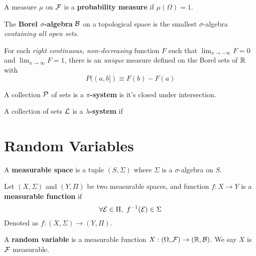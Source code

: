 \documentclass[11pt]{article}
\begin{document}
		
		\begin{definition}
			A measure $\mu$ on $\mathcal{{F}}$ is a \textbf{probability measure} if $\mu(\Omega) = 1$.
		\end{definition}
		
		\begin{definition}
			The \textbf{Borel $\sigma$-algebra} $\mathcal{{B}}$ on a topological space is the smallest $\sigma$-algebra \emph{containing all open sets}.
		\end{definition}
		
		\begin{theorem}
			For each \emph{right continuous, non-decreasing} function $F$ such that $\lim_{x \to -\infty} F = 0$ and $\lim_{x \to \infty} F = 1$, there is an \emph{unique} measure defined on the Borel sets of $\mathbb{R}$ with 
			\begin{equation}
				P((a,b]) \equiv F(b) - F(a)
			\end{equation}
		\end{theorem}
		
		\begin{definition}
			A collection $\mathcal{{P}}$ of sets is a \textbf{$\pi$-system} is it's closed under intersection.
		\end{definition}
		
		\begin{definition}
			A collection of sets $\mathcal{{L}}$ is a \textbf{$\lambda$-system} if
		\end{definition}
	
	\section{Random Variables}
		\begin{definition}
			A \textbf{measurable space} is a tuple $(S, \Sigma)$ where $\Sigma$ is a $\sigma$-algebra on $S$.
		\end{definition}
		\begin{definition}
			Let $(X, \Sigma)$ and $(Y, \Pi)$ be two measurable spaces, and function $f: X \to Y$ is a \textbf{measurable function} if 
			\[
				\forall \mathcal{{E}} \in \Pi,\ f^{-1}(\mathcal{{E}}) \in \Sigma
			\]
			Denoted as $f: (X, \Sigma) \to (Y, \Pi)$.
		\end{definition}
		
		\begin{definition}
			A \textbf{random variable} is a measurable function $X: (\Omega, \mathcal{{F}}) \to (\mathbb{R}, \mathcal{{B}})$. We say $X$ is $\mathcal{{F}}$ measurable.
		\end{definition}
\end{document}
